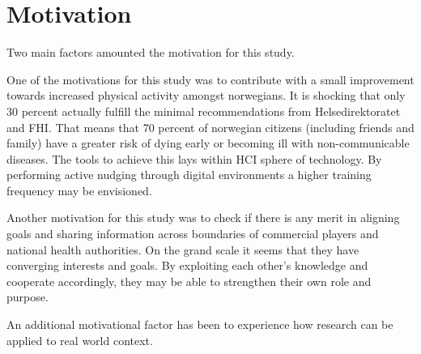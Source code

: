 \chapter*{Motivation} 
Two main factors amounted the motivation for this study. 

One of the motivations for this study was to contribute with a small improvement towards increased physical activity amongst norwegians. It is shocking that only 30 percent actually fulfill the minimal recommendations from Helsedirektoratet and FHI. That means that 70 percent of norwegian citizens (including friends and family) have a greater risk of dying early or becoming ill with non-communicable diseases. The tools to achieve this lays within HCI sphere of technology. By performing active nudging through digital environments a higher training frequency may be envisioned. 

Another motivation for this study was to check if there is any merit in aligning goals and sharing information across boundaries of commercial players and national health authorities. On the grand scale it seems that they have converging interests and goals. By exploiting  each other's knowledge and cooperate accordingly, they may be able to strengthen their own role and purpose. 

An additional motivational factor has been to experience how research can be applied to real world context. 



